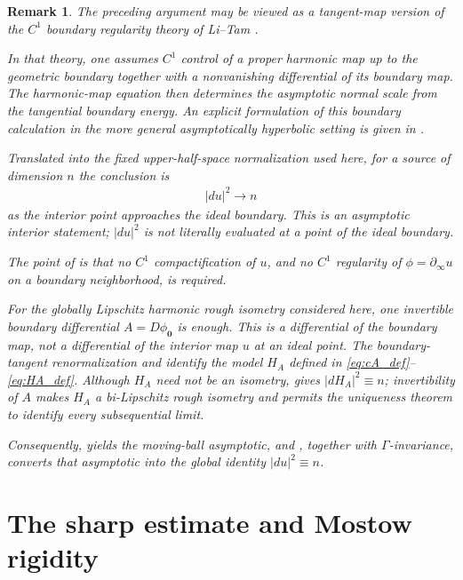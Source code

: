 \documentclass[11pt]{amsart}
\newcommand{\SuggestedDelete}[1]{{\hypersetup{linkcolor=red,citecolor=red,urlcolor=red}\color{red}#1}}
\newcommand{\ReviewUnusedLabel}[1]{%
  \par\noindent
  \SuggestedDelete{\textup{\scriptsize Unused label: \texttt{\detokenize{\label{#1}}}}}%
  \par}
\theoremstyle{plain}
\theoremstyle{plain}
\theoremstyle{plain}
\newtheorem{remark}[theorem]{Remark}
\newcommand{\bdry}{\partial_\infty}
\numberwithin{equation}{section}
\begin{document}
\begin{remark}
The preceding argument may be viewed as a tangent-map version of the
\(C^1\) boundary regularity theory of Li--Tam
\cite{LiTam,LiTamII}.  

In that theory, one assumes \(C^1\) control of a
proper harmonic map up to the geometric boundary together with a
nonvanishing differential of its boundary map.  The harmonic-map equation
then determines the asymptotic normal scale from the tangential boundary
energy.  An explicit formulation of this boundary calculation in the more
general asymptotically hyperbolic setting is given in
\cite[Lemma~1.3 and Corollary~1.4]{AkutagawaMatsumoto}. 

Translated into
the fixed upper-half-space normalization used here, for a source of
dimension \(n\) the
conclusion is
\begin{align}
|du|^2\longrightarrow n
\nonumber
\end{align}
as the interior point approaches the ideal boundary. This is an asymptotic interior statement; \(|du|^2\) is not literally
evaluated at a point of the ideal boundary.

The point of  is that no \(C^1\) compactification of
\(u\), and no \(C^1\) regularity of \(\phi=\bdry u\) on a boundary
neighborhood, is required.  

For the globally Lipschitz harmonic rough isometry considered here, one
invertible boundary differential \(A=D\phi_{\mathbf{0}}\) is enough.  This
is a differential of the boundary map, not a differential of the interior
map \(u\) at an ideal point.  The boundary-tangent renormalization and
 identify the model \(H_A\) defined in
\eqref{eq:cA_def}--\eqref{eq:HA_def}.  Although \(H_A\) need not be an
isometry,  gives \(|dH_A|^2\equiv n\); invertibility
of \(A\) makes \(H_A\) a bi-Lipschitz rough isometry and permits the
uniqueness theorem to identify every subsequential limit.

Consequently,  yields the moving-ball asymptotic, and
, together with \(\Gamma\)-invariance,
converts that asymptotic into the global identity \(|du|^2\equiv n\).
\end{remark}



\section{The sharp estimate and Mostow rigidity}
\end{document}
